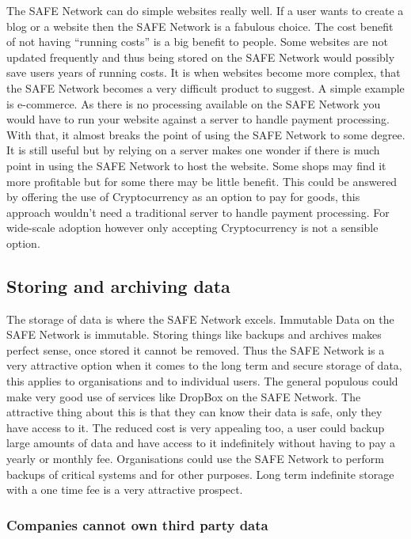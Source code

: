 The SAFE Network can do simple websites really well. If a user wants to create a blog or a website then the SAFE Network is a fabulous choice. The cost benefit of not having ``running costs'' is a big benefit to people. Some websites are not updated frequently and thus being stored on the SAFE Network would possibly save users years of running costs. It is when websites become more complex, that the SAFE Network becomes a very difficult product to suggest. A simple example is e-commerce. As there is no processing available on the SAFE Network you would have to run your website against a server to handle payment processing. With that, it almost breaks the point of using the SAFE Network to some degree. It is still useful but by relying on a server makes one wonder if there is much point in using the SAFE Network to host the website. Some shops may find it more profitable but for some there may be little benefit. This could be answered by offering the use of Cryptocurrency as an option to pay for goods, this approach wouldn't need a traditional server to handle payment processing. For wide-scale adoption however only accepting Cryptocurrency is not a sensible option.

\subsection{Storing and archiving data}

The storage of data is where the SAFE Network excels. Immutable Data on the SAFE Network is immutable. Storing things like backups and archives makes perfect sense, once stored it cannot be removed. Thus the SAFE Network is a very attractive option when it comes to the long term and secure storage of data, this applies to organisations and to individual users. The general populous could make very good use of services like DropBox on the SAFE Network. The attractive thing about this is that they can know their data is safe, only they have access to it. The reduced cost is very appealing too, a user could backup large amounts of data and have access to it indefinitely without having to pay a yearly or monthly fee. Organisations could use the SAFE Network to perform backups of critical systems and for other purposes. Long term indefinite storage with a one time fee is a very attractive prospect.

\subsubsection{Companies cannot own third party data}

